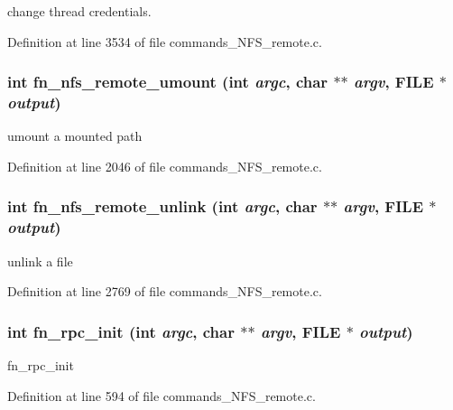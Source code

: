 change thread credentials. 

Definition at line 3534 of file commands\_\-NFS\_\-remote.c.
\subsubsection[{fn\_\-nfs\_\-remote\_\-umount}]{\setlength{\rightskip}{0pt plus 5cm}int fn\_\-nfs\_\-remote\_\-umount (int {\em argc}, \/  char $\ast$$\ast$ {\em argv}, \/  FILE $\ast$ {\em output})}\label{commands__NFS__remote_8c_70c8c0f939759e036b0dd786623f942c}


umount a mounted path 

Definition at line 2046 of file commands\_\-NFS\_\-remote.c.
\subsubsection[{fn\_\-nfs\_\-remote\_\-unlink}]{\setlength{\rightskip}{0pt plus 5cm}int fn\_\-nfs\_\-remote\_\-unlink (int {\em argc}, \/  char $\ast$$\ast$ {\em argv}, \/  FILE $\ast$ {\em output})}\label{commands__NFS__remote_8c_e7889c63ec94ea9fabfe222ef77f734f}


unlink a file 

Definition at line 2769 of file commands\_\-NFS\_\-remote.c.
\subsubsection[{fn\_\-rpc\_\-init}]{\setlength{\rightskip}{0pt plus 5cm}int fn\_\-rpc\_\-init (int {\em argc}, \/  char $\ast$$\ast$ {\em argv}, \/  FILE $\ast$ {\em output})}\label{commands__NFS__remote_8c_4e73bacfb224496a2393bbc05ced1d76}


fn\_\-rpc\_\-init 

Definition at line 594 of file commands\_\-NFS\_\-remote.c.

